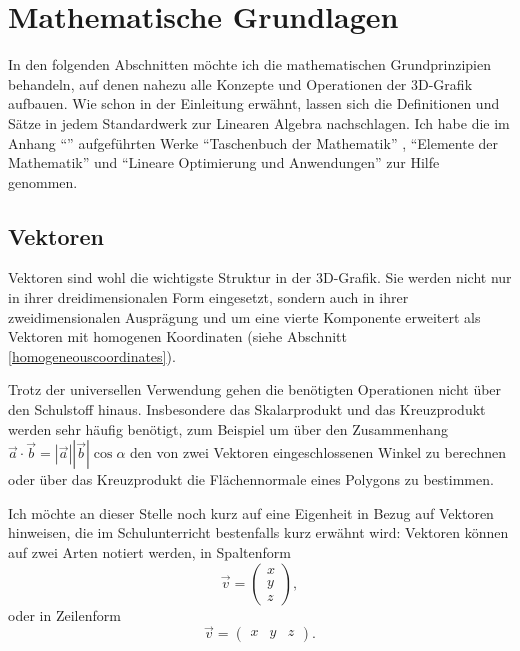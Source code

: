 \chapter{Mathematische Grundlagen}
\label{mathgrundlagen}
In den folgenden Abschnitten möchte ich die mathematischen Grundprinzipien behandeln, auf denen nahezu alle Konzepte und Operationen der 3D-Grafik aufbauen. Wie schon in der Einleitung erwähnt, lassen sich die Definitionen und Sätze in jedem Standardwerk zur Linearen Algebra nachschlagen. Ich habe die im Anhang \enquote{\bibname} aufgeführten Werke \enquote{Taschenbuch der Mathematik} \citep{bronstein}, \enquote{Elemente der Mathematik} \citep{elemente} und \enquote{Lineare Optimierung und Anwendungen} \citep{optimierung} zur Hilfe genommen.

\section{Vektoren}
Vektoren sind wohl die wichtigste Struktur in der 3D-Grafik. Sie werden nicht nur in ihrer dreidimensionalen Form eingesetzt, sondern auch in ihrer zweidimensionalen Ausprägung und um eine vierte Komponente erweitert als Vektoren mit homogenen Koordinaten (siehe Abschnitt \ref{homogeneouscoordinates}).

Trotz der universellen Verwendung gehen die benötigten Operationen nicht über den Schulstoff hinaus. Insbesondere das Skalarprodukt und das Kreuzprodukt werden sehr häufig benötigt, zum Beispiel um über den Zusammenhang
$\vec{a}\cdot\vec{b} = \left|\vec{a}\right|\left|\vec{b}\right|\cos\alpha$
den von zwei Vektoren eingeschlossenen Winkel zu berechnen oder über das Kreuzprodukt die Flächennormale eines Polygons zu bestimmen.

Ich möchte an dieser Stelle noch kurz auf eine Eigenheit in Bezug auf Vektoren hinweisen, die im Schulunterricht bestenfalls kurz erwähnt wird: Vektoren können auf zwei Arten notiert werden, in Spaltenform
\begin{equation*}
 \vec{v} = \begin{pmatrix} x \\ y \\ z \end{pmatrix},
\end{equation*}
oder in Zeilenform
\begin{equation*}
 \vec{v} = \begin{pmatrix} x & y & z \end{pmatrix}.
\end{equation*}


